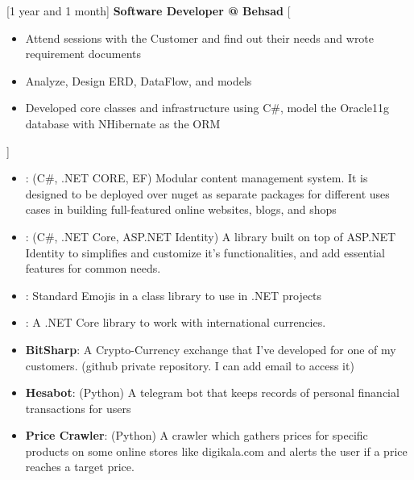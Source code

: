 \documentclass{resume}
\begin{document}
\begin{experiences}
    \separator{0.5ex}
    {[1 year and 1 month] \textbf{Software Developer @ Behsad} }%
    [\begin{itemize}
      \item Attend sessions with the Customer and find out their needs and wrote requirement documents
      \item  Analyze, Design ERD, DataFlow, and models
      \item  Developed core classes and infrastructure using C\#, model the Oracle11g database with NHibernate as the ORM
    \end{itemize}]
\end{experiences}

\begin{itemize}
  \item {}:
    (C\#, .NET CORE, EF)
    Modular content management system. It is designed to be deployed over nuget as separate packages for different uses cases in building full-featured online websites, blogs, and shops
  \item {}:
    (C#, .NET Core, ASP.NET Identity)
    A library built on top of ASP.NET Identity to simplifies and customize it's functionalities, and add essential features for common needs.
  \item {}:
    Standard Emojis in a class library to use in .NET projects
  \item {}:
    A .NET Core library to work with international currencies.
  \item \textbf{BitSharp}: A Crypto-Currency exchange that I've developed for one of my customers. (github private repository. I can add email to access it) 
  \item \textbf{Hesabot}:
  (Python) A telegram bot that keeps records of personal financial transactions for users
  \item \textbf{Price Crawler}:
  (Python) A crawler which gathers prices for specific products on some online stores like digikala.com and alerts the user if a price reaches a target price.
\end{itemize}
\end{document}
